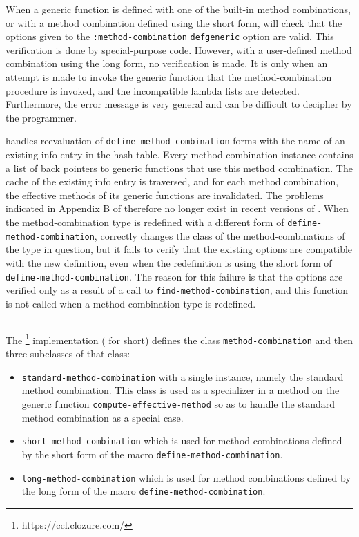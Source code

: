 When a generic function is defined with one of the built-in method
combinations, or with a method combination defined using the short
form, \sbcl{} will check that the options given to the
\texttt{:method-combination} \texttt{defgeneric} option are valid.
This verification is done by special-purpose code.  However, with a
user-defined method combination using the long form, no verification
is made.  It is only when an attempt is made to invoke the generic
function that the method-combination procedure is invoked, and the
incompatible lambda lists are detected.  Furthermore, the error
message is very general and can be difficult to decipher by the
programmer.

\sbcl{} handles reevaluation of \texttt{define-method-combination}
forms with the name of an existing info entry in the hash table.
Every method-combination instance contains a list of back pointers to
generic functions that use this method combination.  The cache of the
existing info entry is traversed, and for each method combination, the
effective methods of its generic functions are invalidated.
The problems indicated in Appendix B of \cite{verna.18.els} therefore
no longer exist in recent versions of \sbcl{}.  When the
method-combination type is redefined with a different form of
\texttt{define-method-combination}, \sbcl{} correctly changes the
class of the method-combinations of the type in question, but it fails
to verify that the existing options are compatible with the new
definition, even when the redefinition is using the short form of
\texttt{define-method-combination}.  The reason for this failure is
that the options are verified only as a result of a call to
\texttt{find-method-combination}, and this function is not called when
a method-combination type is redefined.

\subsection{\clcl{}}
\label{sec-ccl}

The \clcl{}%
\footnote{https://ccl.clozure.com/}
implementation (\ccl{} for short) defines the class
\texttt{method-combination} and then three subclasses of that class:

\begin{itemize}
\item \texttt{standard-method-combination} with a single instance,
  namely the standard method combination.  This class is used as a
  specializer in a method on the generic function
  \texttt{compute-effective-method} so as to handle the standard
  method combination as a special case.
\item \texttt{short-method-combination} which is used for method
  combinations defined by the short form of the macro
  \texttt{define-method-combination}.
\item \texttt{long-method-combination} which is used for method
  combinations defined by the long form of the macro
  \texttt{define-method-combination}.
\end{itemize}

